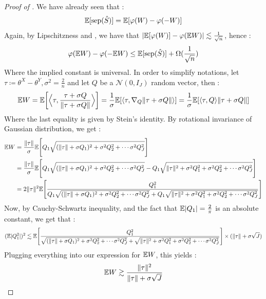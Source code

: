 \begin{proof}[Proof of ]
We have already seen that : 
\begin{equation*}
    \E[\sep(\hat{S})] = \E[\varphi(W)-\varphi(-W)]
\end{equation*}
Again, by Lipschitzness and , we have that $|\E [\varphi(W)]-\varphi(\E W)|\lesssim \frac{1}{\sqrt{n}}$, hence : 
\begin{equation}\label{omega}
    \varphi(\E W)- \varphi(-\E W) \leq \E[\sep(\hat{S})] + \Omega(\frac{1}{\sqrt{n}})
\end{equation}
Where the implied constant is universal. In order to simplify notations, let $\tau \coloneqq \theta^X-\theta^Y, \sigma^2 = \frac{2}{n}$ and let $Q$ be a $\mathcal{N}(0,I_J)$ random vector, then : 
\begin{equation*}
    \E W = \E \bigg[ \bigscal{\tau}{\frac{\tau+\sigma Q}{\norm{\tau+\sigma Q}}}\bigg] = \frac{1}{\sigma}\E[\scal{\tau}{\nabla_Q \norm{\tau+\sigma Q}}] = \frac{1}{\sigma}\E[\scal{\tau}{Q}\norm{\tau+\sigma Q}]
\end{equation*}
Where the last equality is given by Stein's identity. By rotational invariance of Gaussian distribution, we get : 
\begin{align*}
    \E W &= \frac{\norm{\tau}}{\sigma}\E\Bigg[Q_1 \sqrt{(\norm{\tau}+\sigma Q_1)^2+\sigma^2Q_2^2 + \cdots \sigma^2Q_J^2}\Bigg]\\ 
    &= \frac{\norm{\tau}}{\sigma}\E\Bigg[Q_1 \sqrt{(\norm{\tau}+\sigma Q_1)^2+\sigma^2Q_2^2 + \cdots \sigma^2Q_J^2} - Q_1 \sqrt{\norm{\tau}^2+\sigma^2 Q_1^2+\sigma^2 Q_2^2 + \cdots \sigma^2Q_J^2}\Bigg]\\
    &= 2\norm{\tau}^2 \E \Bigg[ \frac{Q_1^2}{Q_1 \sqrt{(\norm{\tau}+\sigma Q_1)^2+\sigma^2Q_2^2 + \cdots \sigma^2Q_J^2} + Q_1 \sqrt{\norm{\tau}^2+\sigma^2 Q_1^2+\sigma^2 Q_2^2 + \cdots \sigma^2Q_J^2}} \Bigg]
\end{align*}
Now, by Cauchy-Schwartz inequality, and the fact that $\E |Q_1| = \frac{2}{\pi}$ is an absolute constant, we get that : 
\begin{equation*}
    (\E |Q_1^2|)^2 \lesssim \E \Bigg[ \frac{Q_1^2}{\sqrt{(\norm{\tau}+\sigma Q_1)^2+\sigma^2Q_2^2 + \cdots \sigma^2Q_J^2} + \sqrt{\norm{\tau}^2+\sigma^2 Q_1^2+\sigma^2 Q_2^2 + \cdots \sigma^2Q_J^2}} \Bigg] \times (\norm{\tau}+\sigma \sqrt{J})
\end{equation*}
Plugging everything into our expression for $\E W$, this yields : 
\begin{equation*}
    \E W \gtrsim \frac{\normp[2]{\tau}}{\norm{\tau} + \sigma\sqrt{J}}
\end{equation*}

\end{proof}
